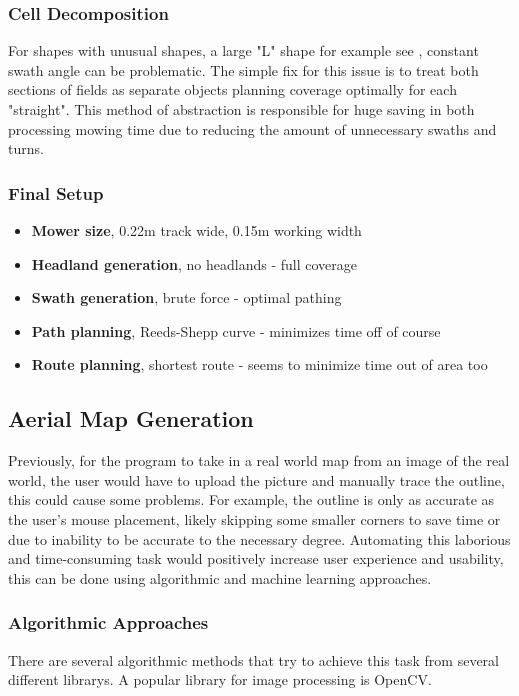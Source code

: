 \documentclass[final]{cmpreport_02}
\begin{document}
\subsubsection{Cell Decomposition}
For shapes with unusual shapes, a large "L" shape for example see , constant swath angle can be problematic.
The simple fix for this issue is to treat both sections of fields as separate objects planning coverage optimally for each "straight".
This method of abstraction is responsible for huge saving in both processing mowing time due to reducing the amount of unnecessary swaths and turns.

\subsubsection{Final Setup}

\begin{itemize}
	\item{\textbf{Mower size}, 0.22m track wide, 0.15m working width}
	\item{\textbf{Headland generation}, no headlands - full coverage}
	\item{\textbf{Swath generation}, brute force - optimal pathing}
	\item{\textbf{Path planning}, Reeds-Shepp curve - minimizes time off of course}
	\item{\textbf{Route planning}, shortest route - seems to minimize time out of area too}
\end{itemize}



\subsection{Aerial Map Generation}
Previously, for the program to take in a real world map from an image of the real world, the user would have to upload the picture and manually trace the outline, this could cause some problems.
For example, the outline is only as accurate as the user's mouse placement, likely skipping some smaller corners to save time or due to inability to be accurate to the necessary degree.
Automating this laborious and time-consuming task would positively increase user experience and usability, this can be done using algorithmic and machine learning approaches.

\subsubsection{Algorithmic Approaches}
There are several algorithmic methods that try to achieve this task from several different librarys. A popular library for image processing is OpenCV\citep{opencv_library}.
\end{document}
